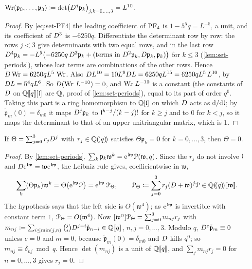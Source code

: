 
\begin{lem}
\label{lem:set-wronskian}
$\operatorname{Wr}(\mathfrak p_0,\dots,\mathfrak p_3)\coloneqq\det\bigl(D^j\mathfrak p_k\bigr)_{j,k=0,\dots,3}=L^{10}$.
\end{lem}

\begin{proof}
By \eqref{eq:set-PF4} the leading coefficient of $\mathrm{PF}_{4}$ is $1-5^5q=L^{-5}$, a unit, and its coefficient of $D^3$ is $-6250q$. Differentiate the determinant row by row: the rows $j<3$ give determinants with two equal rows, and in the last row $D^4\mathfrak p_k=-L^5\bigl(-6250q\,D^3\mathfrak p_k+(\text{terms in }D^2\mathfrak p_k,D\mathfrak p_k,\mathfrak p_k)\bigr)$ for $k\leq3$ (\cref{lem:set-periods}), whose last terms are combinations of the other rows. Hence $D\operatorname{Wr}=6250qL^5\,\operatorname{Wr}$. Also $D L^{10}=10L^9D L=6250qL^{15}=6250qL^5\,L^{10}$, by $D L=5^4qL^6$. So $D(\operatorname{Wr}\,L^{-10})=0$, and $\operatorname{Wr}\,L^{-10}$ is a constant (the constants of $D$ on $\mathbb{Q}[\![ q ]\!][\mathfrak{l}]$ are $\mathbb{Q}$, proof of \cref{lem:set-periods}), equal to its part of order $q^0$. Taking this part is a ring homomorphism to $\mathbb{Q}[\mathfrak{l}]$ on which $D$ acts as $\mathrm{d}/\mathrm{d}\mathfrak{l}$; by $\tilde{\mathfrak p}_m(0)=\delta_{m0}$ it maps $D^j\mathfrak p_k$ to $\mathfrak{l}^{k-j}/(k-j)!$ for $k\geq j$ and to $0$ for $k<j$, so it maps the determinant to that of an upper unitriangular matrix, which is $1$.
\end{proof}

\begin{lem}
\label{lem:set-order3}
If $\Theta=\sum_{j=0}^3r_jD^j$ with $r_j\in\mathbb{Q}(\!(q)\!)$ satisfies $\Theta\mathfrak p_k=0$ for $k=0,\dots,3$, then $\Theta=0$.
\end{lem}

\begin{proof}
By \cref{lem:set-periods}, $\sum_k\mathfrak p_k\mathfrak w^k=\mathrm{e}^{\mathfrak{l}\mathfrak w}\mathcal{P}(\mathfrak w,q)$. Since the $r_j$ do not involve $\mathfrak{l}$ and $D\mathrm{e}^{\mathfrak{l}\mathfrak w}=\mathfrak w\mathrm{e}^{\mathfrak{l}\mathfrak w}$, the Leibniz rule gives, coefficientwise in $\mathfrak w$,
\[
\sum_k(\Theta\mathfrak p_k)\mathfrak w^k=\Theta\bigl(\mathrm{e}^{\mathfrak{l}\mathfrak w}\mathcal{P}\bigr)=\mathrm{e}^{\mathfrak{l}\mathfrak w}\,\mathcal{P}_\Theta,\qquad\mathcal{P}_\Theta\coloneqq\sum_{j=0}^3r_j(D+\mathfrak w)^j\mathcal{P}\in\mathbb{Q}(\!(q)\!)[\![ \mathfrak w ]\!].
\]
The hypothesis says that the left side is $O(\mathfrak w^4)$; as $\mathrm{e}^{\mathfrak{l}\mathfrak w}$ is invertible with constant term $1$, $\mathcal{P}_\Theta=O(\mathfrak w^4)$. Now $[\mathfrak w^n]\mathcal{P}_\Theta=\sum_{j=0}^3m_{nj}r_j$ with $m_{nj}\coloneqq\sum_{i\leq\min(j,n)}\binom jiD^{j-i}\tilde{\mathfrak p}_{n-i}\in\mathbb{Q}[\![ q ]\!]$, $n,j=0,\dots,3$. Modulo $q$, $D^e\tilde{\mathfrak p}_m\equiv0$ unless $e=0$ and $m=0$, because $\tilde{\mathfrak p}_m(0)=\delta_{m0}$ and $D$ kills $q^0$; so $m_{nj}\equiv\delta_{nj}\bmod q$. Hence $\det(m_{nj})$ is a unit of $\mathbb{Q}[\![ q ]\!]$, and $\sum_jm_{nj}r_j=0$ for $n=0,\dots,3$ gives $r_j=0$.
\end{proof}

